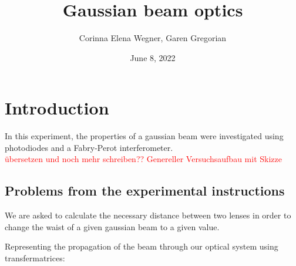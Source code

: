 \documentclass{article}
\begin{document}
 

\begin{titlepage}
\title{Gaussian beam optics}
\author{Corinna Elena Wegner, Garen Gregorian}
\date{June 8, 2022}
\maketitle %
\end{titlepage}

\newpage
\tableofcontents
\newpage

\section{Introduction} 

In this experiment, the properties of a gaussian beam were investigated using photodiodes and a Fabry-Perot interferometer.
\\
\textcolor{red}{übersetzen und noch mehr schreiben??}
\textcolor{red}{Genereller Versuchsaufbau mit Skizze}

\subsection{Problems from the experimental instructions}

We are asked to calculate the necessary distance between two lenses in order to change the waist of a given gaussian beam to a given value.

Representing the propagation of the beam through our optical system using transfermatrices:
\end{document}
